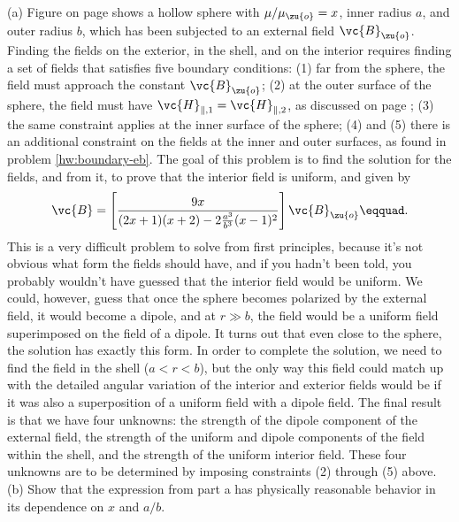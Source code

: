   (a) Figure  on page \pageref{fig:eg-magnetic-shielding-sphere} shows a hollow sphere with $\mu/\mu_\zu{o}=x$,
  inner radius $a$, and outer radius $b$, which has been subjected to an external field $\vc{B}_\zu{o}$. Finding the fields on the exterior, in the
  shell, and on the interior requires finding a set of fields that satisfies five boundary conditions: (1) far from the sphere, the field
  must approach the constant $\vc{B}_\zu{o}$; (2) at the outer surface of the sphere, the field must have
  $\vc{H}_{\parallel,1}=\vc{H}_{\parallel,2}$, as discussed on page  \pageref{fig:permeability-boundary}; (3) the same constraint applies
  at the inner surface of the sphere; (4) and (5) there is an additional constraint on the fields at the inner and outer surfaces, as found in problem
  \ref{hw:boundary-eb}. The goal of this problem is to find the solution for the fields, and from it, to prove that the interior field
  is uniform, and given by
  \begin{equation*}
       \vc{B} = \left[\frac{9x}{(2x+1)(x+2)-2\frac{a^3}{b^3}(x-1)^2}\right]\vc{B}_\zu{o}\eqquad.
  \end{equation*}
  This is a very difficult problem to solve from first principles, because it's not obvious what form the fields should have, and if you hadn't been
  told, you probably wouldn't have guessed that the interior field would be uniform. We could, however, guess that once the sphere becomes polarized
  by the external field, it would become a dipole, and at $r\gg b$, the field would be a uniform field superimposed on the field of a dipole.
  It turns out that even close to the sphere, the solution has exactly this form. In order to complete the solution, we need to find the field
  in the shell ($a<r<b$), but the only way this field could match up with the detailed angular variation of the interior and exterior fields
  would be if it was also a superposition of a uniform field with a dipole field. The final result is that we have four unknowns: the strength
  of the dipole component of the external field, the strength of the uniform and dipole components of the field within the shell, and the
  strength of the uniform interior field. These four unknowns are to be determined by imposing constraints (2) through (5) above.\hwendpart
  (b) Show that the expression from part a has physically reasonable behavior in its dependence on $x$ and $a/b$.  
